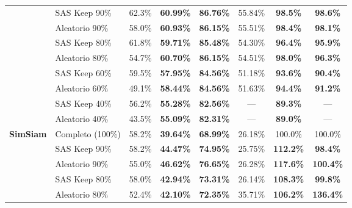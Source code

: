 \begin{table}[t]
\begin{tabular}{llcccccc}
                       & SAS Keep 90\%     & 62.3\% \cite{joshi2023sas}                & \textbf{60.99\%} & \textbf{86.76\%} & 55.84\% & \textbf{98.5\%} & \textbf{98.6\%} \\
                       & Aleatorio 90\%    & 58.0\% \cite{joshi2023sas}                & \textbf{60.93\%} & \textbf{86.15\%} & 55.51\% & \textbf{98.4\%} & \textbf{98.1\%} \\
                       & SAS Keep 80\%     & 61.8\% \cite{joshi2023sas}                & \textbf{59.71\%} & \textbf{85.48\%} & 54.30\% & \textbf{96.4\%} & \textbf{95.9\%} \\
                       & Aleatorio 80\%    & 54.7\% \cite{joshi2023sas}                & \textbf{60.70\%} & \textbf{86.15\%} & 54.51\% & \textbf{98.0\%} & \textbf{96.3\%} \\
                       & SAS Keep 60\%     & 59.5\% \cite{joshi2023sas}                & \textbf{57.95\%} & \textbf{84.56\%} & 51.18\% & \textbf{93.6\%} & \textbf{90.4\%} \\
                       & Aleatorio 60\%    & 49.1\% \cite{joshi2023sas}                & \textbf{58.44\%} & \textbf{84.56\%} & 51.63\% & \textbf{94.4\%} & \textbf{91.2\%} \\
                       & SAS Keep 40\%     & 56.2\% \cite{joshi2023sas}                & \textbf{55.28\%} & \textbf{82.56\%} & ---     & \textbf{89.3\%} & --- \\
                       & Aleatorio 40\%    & 43.5\% \cite{joshi2023sas}                & \textbf{55.09\%} & \textbf{82.31\%} & ---     & \textbf{89.0\%} & --- \\
\midrule
\textbf{SimSiam}       & Completo (100\%)  & 58.2\% \cite{joshi2023sas, chen2021simsiam}& \textbf{39.64\%} & \textbf{68.99\%} & 26.18\% & 100.0\% & 100.0\% \\
                       & SAS Keep 90\%     & 58.2\% \cite{joshi2023sas}                & \textbf{44.47\%} & \textbf{74.95\%} & 25.75\% & \textbf{112.2\%} & \textbf{98.4\%} \\
                       & Aleatorio 90\%    & 55.0\% \cite{joshi2023sas}                & \textbf{46.62\%} & \textbf{76.65\%} & 26.28\% & \textbf{117.6\%} & \textbf{100.4\%} \\
                       & SAS Keep 80\%     & 58.0\% \cite{joshi2023sas}                & \textbf{42.94\%} & \textbf{73.31\%} & 26.14\% & \textbf{108.3\%} & \textbf{99.8\%} \\
                       & Aleatorio 80\%    & 52.4\% \cite{joshi2023sas}                & \textbf{42.10\%} & \textbf{72.35\%} & 35.71\% & \textbf{106.2\%} & \textbf{136.4\%} \\

\end{tabular}
\end{table}

